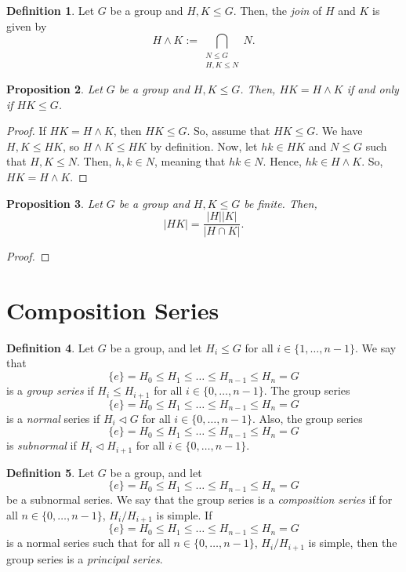 \documentclass[a4paper, openany]{memoir}
\theoremstyle{definition}
\newtheorem{definition}{Definition}[section]
\theoremstyle{plain}
\newtheorem{proposition}[definition]{Proposition}
\begin{document}
    \begin{definition}
        Let $G$ be a group and $H, K \leq G$. Then, the \emph{join} of $H$ and $K$ is given by
        \[H \wedge K := \bigcap_{\substack{N \leq G \\ H, K \leq N}} N.\]
    \end{definition}

    \begin{proposition}
        Let $G$ be a group and $H, K \leq G$. Then, $HK = H \wedge K$ if and only if $HK \leq G$.
    \end{proposition}
    \begin{proof}
        If $HK = H \wedge K$, then $HK \leq G$. So, assume that $HK \leq G$. We have $H, K \leq HK$, so $H \wedge K \leq HK$ by definition. Now, let $hk \in HK$ and $N \leq G$ such that $H, K \leq N$. Then, $h, k \in N$, meaning that $hk \in N$. Hence, $hk \in H \wedge K$. So, $HK = H \wedge K$.
    \end{proof}

    \begin{proposition}
        Let $G$ be a group and $H, K \leq G$ be finite. Then,
        \[|HK| = \frac{|H| |K|}{|H \cap K|}.\]
    \end{proposition}
    \begin{proof}
        
    \end{proof}
    \newpage
    
    \section{Composition Series}
    \begin{definition}
        Let $G$ be a group, and let $H_i \leq G$ for all $i \in \{1, \dots, n-1\}$. We say that 
        \[\{e\} = H_0 \leq H_1 \leq \dots \leq H_{n-1} \leq H_n = G\]
        is a \emph{group series} if $H_i \leq H_{i+1}$ for all $i \in \{0, \dots, n-1\}$. The group series
        \[\{e\} = H_0 \leq H_1 \leq \dots \leq H_{n-1} \leq H_n = G\]
        is a \emph{normal} series if $H_i \vartriangleleft G$ for all $i \in \{0, \dots, n-1\}$. Also, the group series
        \[\{e\} = H_0 \leq H_1 \leq \dots \leq H_{n-1} \leq H_n = G\]
        is \emph{subnormal} if $H_i \vartriangleleft H_{i+1}$ for all $i \in \{0, \dots, n-1\}$.
    \end{definition}

    \begin{definition}
        Let $G$ be a group, and let 
        \[\{e\} = H_0 \leq H_1 \leq \dots \leq H_{n-1} \leq H_n = G\]
        be a subnormal series. We say that the group series is a \emph{composition series} if for all $n \in \{0, \dots, n-1\}$, $H_i/H_{i+1}$ is simple. If 
        \[\{e\} = H_0 \leq H_1 \leq \dots \leq H_{n-1} \leq H_n = G\]
        is a normal series such that for all $n \in \{0, \dots, n-1\}$, $H_i/H_{i+1}$ is simple, then the group series is a \emph{principal series}.
    \end{definition}
\end{document}
